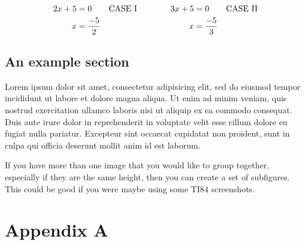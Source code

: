\documentclass[a4paper, openany]{maatext}
\numberwithin{section}{chapter}
\numberwithin{equation}{chapter}
\begin{document}
\begin{equation*}
\begin{aligned}
2x + 5 &= 0 && \text{CASE I} \\
x &= \dfrac{- 5}{2} 
\end{aligned}
\qquad \qquad
\begin{aligned}
3x + 5 &= 0 && \text{CASE II} \\
x &= \dfrac{- 5}{3} 
\end{aligned}
\end{equation*}

\section{An example section}

Lorem ipsum dolor sit amet, consectetur adipisicing elit, sed do eiusmod tempor incididunt ut labore et dolore magna aliqua. Ut enim ad minim veniam, quis nostrud exercitation ullamco laboris nisi ut aliquip ex ea commodo consequat. Duis aute irure dolor in reprehenderit in voluptate velit esse cillum dolore eu fugiat nulla pariatur. Excepteur sint occaecat cupidatat non proident, sunt in culpa qui officia deserunt mollit anim id est laborum. \cite{Eigen1971}

If you have more than one image that you would like to group together, especially if they are the same height, then you can create a set of subfigures.  This could be good if you were maybe using some TI84 screenshots.






%
%

\appendix
\chapter{Appendix A}
\backmatter

\printbibliography

\end{document}
